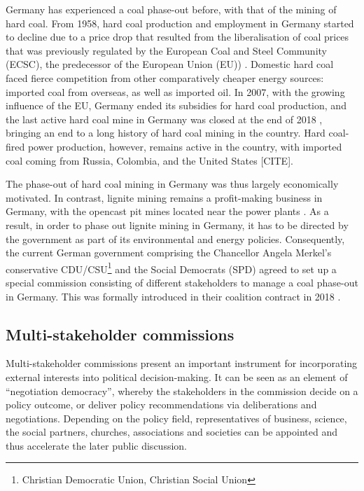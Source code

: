 \documentclass[12pt,onecolumn,twoside]{layout}
\begin{document}
Germany has experienced a coal phase-out before, with that of the mining of hard coal. From 1958, hard coal production and employment in Germany started to decline due to a price drop that resulted from the liberalisation of coal prices that was previously regulated by the European Coal and Steel Community (ECSC), the predecessor of the European Union (EU)) \cite{Oei2019}. Domestic hard coal faced fierce competition from other comparatively cheaper energy sources: imported coal from overseas, as well as imported oil.  In 2007, with the growing influence of the EU, Germany ended its subsidies for hard coal production, and the last active hard coal mine in Germany was closed at the end of 2018 \cite{Appunn2018}, bringing an end to a long history of hard coal mining in the country. Hard coal-fired power production, however, remains active in the country, with imported coal coming from Russia, Colombia, and the United States [CITE]. 

The phase-out of hard coal mining in Germany was thus largely economically motivated. In contrast, lignite mining remains a profit-making business in Germany, with the opencast pit mines located near the power plants \cite{Appunn2019}. As a result, in order to phase out lignite mining in Germany, it has to be directed by the government as part of its environmental and energy policies. Consequently, the current German government comprising the Chancellor Angela Merkel's conservative CDU/CSU\footnote{Christian Democratic Union, Christian Social Union} and the Social Democrats (SPD) agreed to set up a special commission consisting of different stakeholders to manage a coal phase-out in Germany. This was formally introduced in their coalition contract in 2018 \cite{Wehrmann2018}.  

\subsection*{Multi-stakeholder commissions}
Multi-stakeholder commissions present an important instrument for incorporating external interests into political decision-making. It can be seen as an element of ``negotiation democracy'', whereby the stakeholders in the commission decide on a policy outcome, or deliver policy recommendations via deliberations and negotiations. Depending on the policy field, representatives of business, science, the social partners, churches, associations and societies can be appointed and thus accelerate the later public discussion. \cite{Siefken2016}
\end{document}
